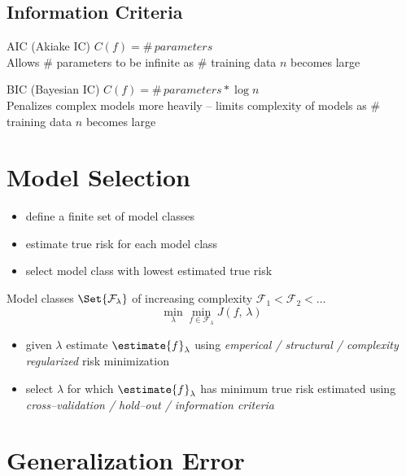 \documentclass[18pt,a3paper,landscape, ncols=3]{cheatsheet}
\begin{document}
	\subsection{Information Criteria}
		\begin{mdframed}
			AIC (Akiake IC) \quad \(C(f) = \#\, parameters\)\\
			\indent Allows \(\#\) parameters to be infinite as \(\#\) training data \(n\) becomes large
		\end{mdframed}
		\begin{mdframed}
			BIC (Bayesian IC) \quad \(C(f) = \#\, parameters * \log n\)\\
			\indent Penalizes complex models more heavily -- limits complexity of models as \(\#\) training data \(n\) becomes large
		\end{mdframed}

\section{Model Selection} \seperator
	\begin{mdframed}
		\begin{itemize}
			\item define a finite set of model classes
			\item estimate true risk for each model class
			\item select model class with lowest estimated true risk
		\end{itemize}
	\end{mdframed}
	\begin{mdframed}
		Model classes \(\Set{\mathcal{F}_{\lambda}}\) of increasing complexity \(\mathcal{F}_{1} < \mathcal{F}_{2} < \ldots\)
		\[\min_{\lambda} \min_{f \in \mathcal{F}_{\lambda}} J(f,\, \lambda)\]
		\begin{itemize}
			\item given \(\lambda\) estimate \(\estimate{f}_{\lambda}\) using \textit{emperical / structural / complexity regularized} risk minimization
			\item select \(\lambda\) for which \(\estimate{f}_{\lambda}\) has minimum true risk estimated using \textit{cross--validation / hold--out / information criteria}
		\end{itemize}
	\end{mdframed}

\section{Generalization Error} \seperator
\end{document}
